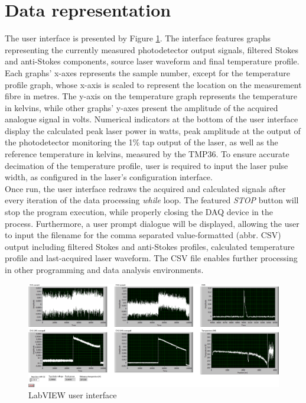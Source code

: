 \documentclass{standalone}
\begin{document}
\section{Data representation}

The user interface is presented by Figure \ref{fig:user_interface}. The interface features graphs representing the currently measured photodetector output signals, filtered Stokes and anti-Stokes components, source laser waveform and final temperature profile. Each graphs' x-axes represents the sample number, except for the temperature profile graph, whose x-axis is scaled to represent the location on the measurement fibre in metres. The y-axis on the temperature graph represents the temperature in kelvins, while other graphs' y-axes present the amplitude of the acquired analogue signal in volts. Numerical indicators at the bottom of the user interface display the calculated peak laser power in watts, peak amplitude at the output of the photodetector monitoring the 1\% tap output of the laser, as well as the reference temperature in kelvins, measured by the TMP36. To ensure accurate decimation of the temperature profile, user is required to input the laser pulse width, as configured in the laser's configuration interface. \\

Once run, the user interface redraws the acquired and calculated signals after every iteration of the data processing \textit{while} loop. The featured \textit{STOP} button will stop the program execution, while properly closing the DAQ device in the process. Furthermore, a user prompt dialogue will be displayed, allowing the user to input the filename for the comma separated value-formatted (abbr. CSV) output including filtered Stokes and anti-Stokes profiles, calculated temperature profile and last-acquired laser waveform. The CSV file enables further processing in other programming and data analysis environments.

\begin{landscape}
	\begin{figure}[h]
		\centering
		\includegraphics[width=1.05\linewidth]{user_interface.png}
		\caption{LabVIEW user interface}
		\label{fig:user_interface}
	\end{figure}
\end{landscape}

\setcounter{page}{\thepage-1}


\setcounter{stranica}{\thepage}
\addtocounter{stranica}{1}
\end{document}
